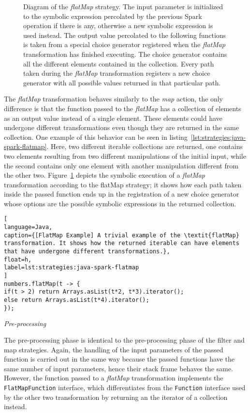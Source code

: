 \begin{figure}[t]
\begin{tikzpicture}[node distance=2cm, auto]
	
	\end{tikzpicture}
	\caption[Diagram of the \textit{flatMap} Strategy]{Diagram of the \textit{flatMap} strategy. The input parameter is initialized to the symbolic expression percolated by the previous Spark operation if there is any, otherwise a new symbolic expression is used instead. The output value percolated to the following functions is taken from a special choice generator registered when the \textit{flatMap} transformation has finished executing. The choice generator contains all the different elements contained in the collection. Every path taken during the \textit{flatMap} transformation registers a new choice generator with all possible values returned in that particular path.}
	\label{fig:strategies:flatMap}
\end{figure}

The \textit{flatMap} transformation behaves similarly to the \textit{map} action, the only difference is that the function passed to the \textit{flatMap} has a collection of elements as an output value instead of a single element. These elements could have undergone different transformations even though they are returned in the same collection. One example of this behavior can be seen in listing~\ref{lst:strategies:java-spark-flatmap}. Here, two different iterable collections are returned, one contains two elements resulting from two different manipulations of the initial input, while the second contains only one element with another manipulation different from the other two. Figure~\ref{fig:strategies:flatMap} depicts the symbolic execution of a \textit{flatMap} transformation according to the flatMap strategy; it shows how each path taken inside the passed function ends up in the registration of a new choice generator whose options are the possible symbolic expressions in the returned collection.

\begin{lstlisting}[
language=Java,
caption={[FlatMap Example] A trivial example of the \textit{flatMap} transformation. It shows how the returned iterable can have elements that have undergone different transformations.},
float=h,
label=lst:strategies:java-spark-flatmap
]
numbers.flatMap(t -> {				
if(t > 2) return Arrays.asList(t*2, t*3).iterator();
else return Arrays.asList(t*4).iterator();				
});
\end{lstlisting}

\textit{Pre-processing}

The pre-processing phase is identical to the pre-processing phase of the filter and map strategies. Again, the handling of the input parameters of the passed function is carried out in the same way because the passed functions have the same number of input parameters, hence their stack frame behaves the same. However, the function passed to a \textit{flatMap} transformation implements the \texttt{FlatMapFunction} interface, which differentiates from the \texttt{Function} interface used by the other two transformation by returning an the iterator of a collection instead.

